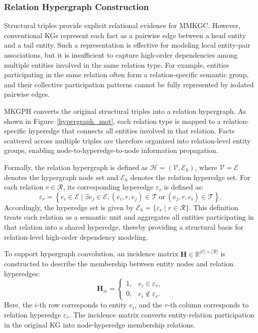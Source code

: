 \documentclass[a4paper,fleqn]{cas-sc}
\begin{document}
\subsubsection{Relation Hypergraph Construction}

Structural triples provide explicit relational evidence for MMKGC. However, conventional KGs represent each fact as a pairwise edge between a head entity and a tail entity. Such a representation is effective for modeling local entity-pair associations, but it is insufficient to capture high-order dependencies among multiple entities involved in the same relation type. For example, entities participating in the same relation often form a relation-specific semantic group, and their collective participation patterns cannot be fully represented by isolated pairwise edges.

MKGPH converts the original structural triples into a relation hypergraph. As shown in Figure~\ref{hypergraph_mot}, each relation type is mapped to a relation-specific hyperedge that connects all entities involved in that relation. Facts scattered across multiple triples are therefore organized into relation-level entity groups, enabling node-to-hyperedge-to-node information propagation.

Formally, the relation hypergraph is defined as $\mathcal{H}=(\mathcal{V},\mathcal{E}_{h})$, where $\mathcal{V}=\mathcal{E}$ denotes the hypergraph node set and $\mathcal{E}_{h}$ denotes the relation hyperedge set. For each relation $r\in\mathcal{R}$, its corresponding hyperedge $\varepsilon_r$ is defined as:
\begin{equation}
\varepsilon_r
=
\left\{
e_i\in\mathcal{E}
\mid
\exists e_j\in\mathcal{E},
(e_i,r,e_j)\in\mathcal{T}
\ \mathrm{or}\
(e_j,r,e_i)\in\mathcal{T}
\right\}.
\end{equation}
Accordingly, the hyperedge set is given by $\mathcal{E}_{h}=\{\varepsilon_r\mid r\in\mathcal{R}\}$. This definition treats each relation as a semantic unit and aggregates all entities participating in that relation into a shared hyperedge, thereby providing a structural basis for relation-level high-order dependency modeling.

To support hypergraph convolution, an incidence matrix $\mathbf{H}\in\mathbb{R}^{|\mathcal{E}|\times|\mathcal{R}|}$ is constructed to describe the membership between entity nodes and relation hyperedges:
\begin{equation}
\mathbf{H}_{ir}
=
\begin{cases}
1, & e_i\in\varepsilon_r, \\
0, & e_i\notin\varepsilon_r.
\end{cases}
\end{equation}
Here, the $i$-th row corresponds to entity $e_i$, and the $r$-th column corresponds to relation hyperedge $\varepsilon_r$. The incidence matrix converts entity-relation participation in the original KG into node-hyperedge membership relations.
\end{document}
